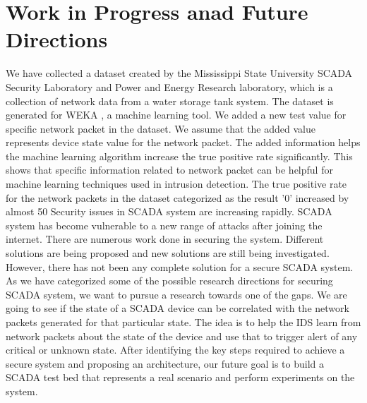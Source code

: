 \documentclass[letterpaper, 10 pt, conference]{ieeeconf}  %
\begin{document}
\section{Work in Progress anad Future Directions}
We have collected a dataset \cite{c35} created by the Mississippi State University SCADA Security Laboratory and Power and Energy Research laboratory, which is a collection of network data from a water storage tank system. The dataset is generated for WEKA \cite{c36}, a machine learning tool. We added a new test value for specific network packet in the dataset. We assume that the added value represents device state value for the network packet. The added information helps the machine learning algorithm increase the true positive rate significantly. This shows that specific information related to network packet can be helpful for machine learning techniques used in intrusion detection. The true positive rate for the network packets in the dataset categorized as the result '0' increased by almost 50%
Security issues in SCADA system are increasing rapidly. SCADA system has become vulnerable to a new range of attacks after joining the internet. There are numerous work done in securing the system. Different solutions are being proposed and new solutions are still being investigated. However, there has not been any complete solution for a secure SCADA system. As we have categorized some of the possible research directions for securing SCADA system, we want to pursue a research towards one of the gaps. We are going to see if the state of a SCADA device can be correlated with the network packets generated for that particular state. The idea is to help the IDS learn from network packets about the state of the device and use that to trigger alert of any critical or unknown state. After identifying the key steps required to achieve a secure system and proposing an architecture, our future goal is to build a SCADA test bed that represents a real scenario and perform experiments on the system. 
\
   
\end{document}
